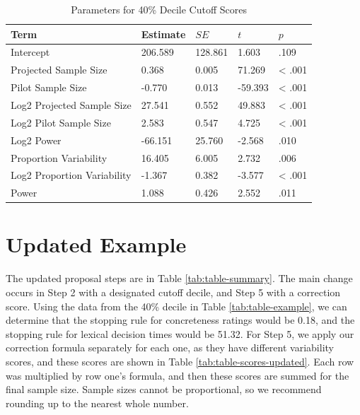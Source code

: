 \documentclass[
  man]{apa7}
\begin{document}
\begin{table}[tbp]

\begin{center}
\begin{threeparttable}

\caption{\label{tab:table-decile}Parameters for 40\% Decile Cutoff Scores}

\begin{tabular}{lllll}
\toprule
Term & Estimate & $SE$ & $t$ & $p$\\
\midrule
Intercept & 206.589 & 128.861 & 1.603 & .109\\
Projected Sample Size & 0.368 & 0.005 & 71.269 & < .001\\
Pilot Sample Size & -0.770 & 0.013 & -59.393 & < .001\\
Log2 Projected Sample Size & 27.541 & 0.552 & 49.883 & < .001\\
Log2 Pilot Sample Size & 2.583 & 0.547 & 4.725 & < .001\\
Log2 Power & -66.151 & 25.760 & -2.568 & .010\\
Proportion Variability & 16.405 & 6.005 & 2.732 & .006\\
Log2 Proportion Variability & -1.367 & 0.382 & -3.577 & < .001\\
Power & 1.088 & 0.426 & 2.552 & .011\\
\bottomrule
\end{tabular}

\end{threeparttable}
\end{center}

\end{table}

\hypertarget{updated-example}{%
\section{Updated Example}\label{updated-example}}

The updated proposal steps are in Table \ref{tab:table-summary}. The main change occurs in Step 2 with a designated cutoff decile, and Step 5 with a correction score. Using the data from the 40\% decile in Table \ref{tab:table-example}, we can determine that the stopping rule for concreteness ratings would be 0.18, and the stopping rule for lexical decision times would be 51.32. For Step 5, we apply our correction formula separately for each one, as they have different variability scores, and these scores are shown in Table \ref{tab:table-scores-updated}. Each row was multiplied by row one's formula, and then these scores are summed for the final sample size. Sample sizes cannot be proportional, so we recommend rounding up to the nearest whole number.
\end{document}
